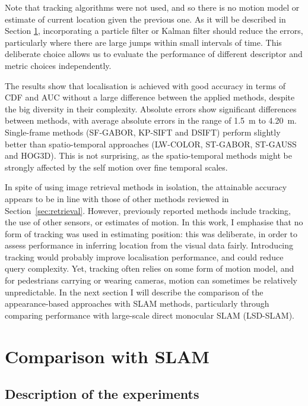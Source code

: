 Note that tracking algorithms were not used, and so there is no motion model or estimate of current location given the previous one. As it will be described in Section \ref{sec:slamcomp}, incorporating a particle filter or Kalman filter should reduce the errors, particularly where there are large jumps within small intervals of time. This deliberate choice allows us to evaluate the performance of different descriptor and metric choices independently.

The results show that localisation is achieved with good accuracy in terms of CDF and AUC without a large difference between the applied methods, despite the big diversity in their complexity. Absolute errors show significant differences between methods, with average absolute errors in the range of \SI{1.5}{m} to \SI{4.20}{m}. Single-frame methods (SF-GABOR, KP-SIFT and DSIFT) perform slightly better than spatio-temporal approaches (LW-COLOR, ST-GABOR, ST-GAUSS and HOG3D). This is not surprising, as the spatio-temporal methods might be strongly affected by the self motion over fine temporal scales.

In spite of using image retrieval methods in isolation, the attainable accuracy appears to be in line with those of  other methods reviewed in Section~\ref{sec:retrieval}.  However, previously reported methods include tracking, the use of other sensors, or estimates of motion. In this work, I emphasise that no form of tracking was used in estimating position: this was deliberate, in order to assess performance in inferring location from the visual data fairly.  Introducing tracking would probably improve localisation performance, and could reduce query complexity. Yet, tracking often relies on some form of motion model, and for pedestrians carrying or wearing cameras, motion can sometimes be relatively unpredictable. In the next section I will describe the comparison of the appearance-based approaches with SLAM methods, particularly through comparing performance with large-scale direct monocular SLAM (LSD-SLAM).

\section{Comparison with SLAM}
\label{sec:slamcomp}


\subsection{Description of the experiments}

